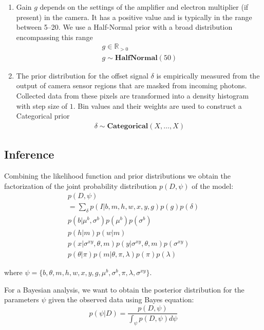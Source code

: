 \begin{enumerate}
\item Gain $g$ depends on the settings of the amplifier and electron multiplier (if present) in the camera. It has a positive value and is typically in the range between 5--20. We use a Half-Normal prior with a broad distribution encompassing this range
%
\begin{gather*}
    g \in \mathbb{R}_{>0} \\
    g \sim \mathbf{HalfNormal}(50)
\end{gather*}

\item The prior distribution for the offset signal $\delta$ is empirically measured from the output of camera sensor regions that are masked from incoming photons. Collected data from these pixels are transformed into a density histogram with step size of $1$. Bin values and their weights are used to construct a Categorical prior
%
\begin{gather*}
    \delta \sim \mathbf{Categorical}(X, \dots, X)
\end{gather*}

\end{enumerate}



\subsection*{Inference}

Combining the likelihood function and prior distributions we obtain the factorization of the joint probability distribution $p(D, \psi)$ of the model:
%
\begin{gather*}
    p(D, \psi) \\
    = \sum_\delta p(I | b, m, h, w, x, y, g) p(g) p(\delta) \\
    p(b | \mu^b, \sigma^b) p(\mu^b) p(\sigma^b) \\
    p(h | m) p(w | m) \\
    p(x | \sigma^{xy}, \theta, m) p(y | \sigma^{xy}, \theta, m) p(\sigma^{xy}) \\
    p(\theta | \pi) p(m | \theta, \pi, \lambda) p(\pi) p(\lambda) 
\end{gather*} 

\noindent
where $\psi = \{ b, \theta, m, h, w, x, y, g, \mu^b, \sigma^b, \pi, \lambda, \sigma^{xy} \}$.

For a Bayesian analysis, we want to obtain the posterior distribution for the parameters $\psi$ given the observed data using Bayes equation:
%
\begin{equation}
    p(\psi | D) =
    \dfrac{p(D, \psi)}{\int_\psi p(D, \psi) d\psi}
\end{equation}

